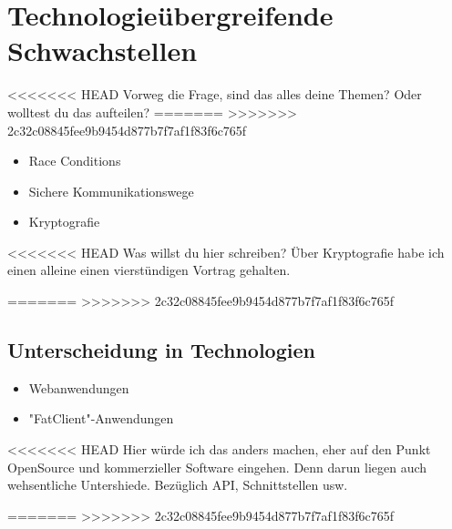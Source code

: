 \section{Technologieübergreifende Schwachstellen}

<<<<<<< HEAD
Vorweg die Frage, sind das alles deine Themen? Oder wolltest du das aufteilen?
=======
>>>>>>> 2c32c08845fee9b9454d877b7f7af1f83f6c765f

\begin{itemize}
   \item Race Conditions
   \item Sichere Kommunikationswege
   \item Kryptografie
\end{itemize}

<<<<<<< HEAD
Was willst du hier schreiben? Über Kryptografie habe ich einen alleine einen vierstündigen Vortrag gehalten.

=======
>>>>>>> 2c32c08845fee9b9454d877b7f7af1f83f6c765f

\subsection{Unterscheidung in Technologien}

\begin{itemize}
   \item Webanwendungen
   \item "FatClient"-Anwendungen
\end{itemize}

<<<<<<< HEAD
Hier würde ich das anders machen, eher auf den Punkt OpenSource und kommerzieller Software eingehen. Denn darun liegen auch wehsentliche Untershiede. Bezüglich API, Schnittstellen usw.

=======
>>>>>>> 2c32c08845fee9b9454d877b7f7af1f83f6c765f

